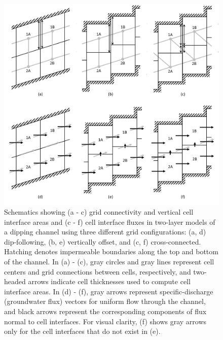 \documentclass{article}
\begin{document}
\begin{figure}
	\begin{center}
	\includegraphics[scale=0.4]{../figures/schem_conn_area_flux_resaved.png}
	\caption{Schematics showing (a - c) grid connectivity and vertical cell interface areas and (c - f) cell interface fluxes in two-layer models of a dipping channel using three different grid configurations: (a, d) dip-following, (b, e) vertically offset, and (c, f) cross-connected. Hatching denotes impermeable boundaries along the top and bottom of the channel. In (a) - (c), gray circles and gray lines represent cell centers and grid connections between cells, respectively, and two-headed arrows indicate cell thicknesses used to compute cell interface areas. In (d) - (f), gray arrows represent specific-discharge (groundwater flux) vectors for uniform flow through the channel, and black arrows represent the corresponding components of flux normal to cell interfaces. For visual clarity, (f) shows gray arrows only for the cell interfaces that do not exist in (e).}
	\label{fig:schem-conn-area-flux}
	\end{center}
\end{figure}
\end{document}

